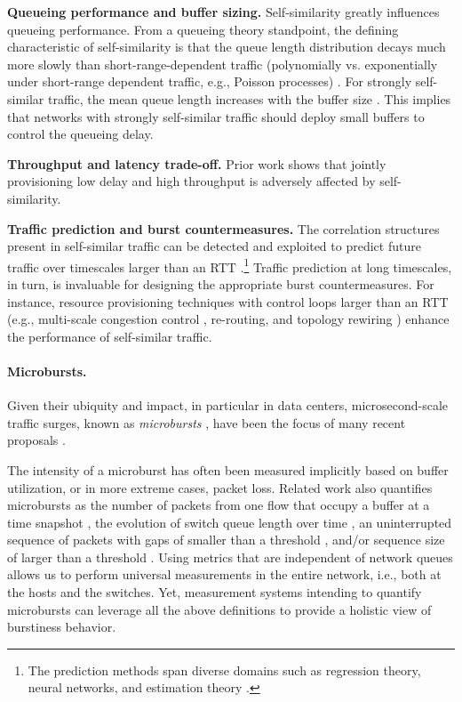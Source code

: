 \begin{compactitem}
\item{\textbf{Queueing performance and buffer sizing.} Self-similarity greatly influences queueing performance. From a queueing theory standpoint, the defining characteristic of self-similarity is that the queue length distribution decays much more slowly than short-range-dependent traffic (polynomially vs. exponentially under short-range dependent traffic, e.g., Poisson processes) \cite{mts_cc}. For strongly self-similar traffic, the mean queue length increases with the buffer size \cite{park1997effect}. This implies that  networks with strongly self-similar traffic should deploy small buffers to control the queueing delay. }

\item{\textbf{Throughput and latency trade-off.} Prior work \cite{filesize, park1997effect} shows that jointly provisioning low delay and high throughput is adversely affected by self-similarity.}

\item {\textbf{Traffic prediction and burst countermeasures.} The correlation structures present in self-similar traffic can be detected and exploited to predict future traffic over timescales larger than an RTT \cite{mts_cc}.\footnote{The prediction methods span diverse domains such as regression theory, neural networks, and estimation theory \cite{mts_cc}.} Traffic prediction at long timescales, in turn, is invaluable for designing the appropriate burst countermeasures. For instance, resource provisioning techniques with control loops larger than an RTT (e.g., multi-scale congestion control \cite{mts_cc}, re-routing, and topology rewiring \cite{gemini}) enhance the performance of self-similar traffic.}

\end{compactitem}


\paragraph{Microbursts.} Given their ubiquity and impact, in particular in data centers, microsecond-scale traffic surges, known as \emph{microbursts}  \cite{wild,hpcc,high-resolution}, have been the focus of many recent proposals \cite{conquest,vertigo,acc,swift,bfc,hpcc}.

The intensity of a microburst has often been measured implicitly based on buffer utilization, or in more extreme cases, packet loss. Related work also quantifies microbursts as the number of packets from one flow that occupy a buffer at a time snapshot \cite{radar}, the evolution of switch queue length over time \cite{observation}, an uninterrupted sequence of packets with gaps of smaller than a threshold \cite{bullet}, and/or sequence size of larger than a threshold \cite{bs}.
Using metrics that are independent of network queues allows us to perform universal measurements in the entire network, i.e., both at the hosts and the switches. Yet, measurement systems intending to quantify microbursts can leverage all the above definitions to provide a holistic view of burstiness behavior.

